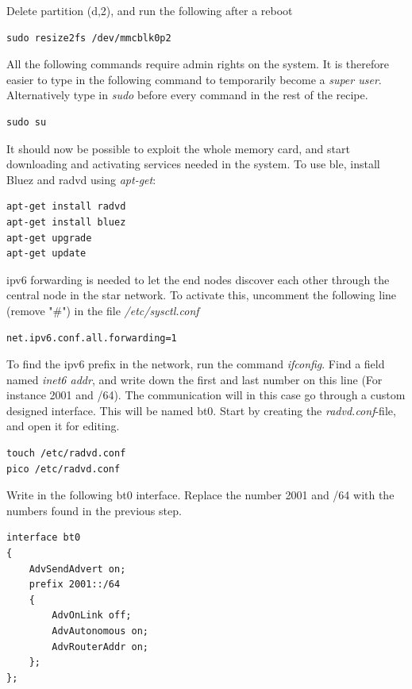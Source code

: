 Delete partition (d,2), and run the following after a reboot

\begin{verbatim}
sudo resize2fs /dev/mmcblk0p2
\end{verbatim}

\noindent All the following commands require admin rights on the system. It is therefore easier to type in the following command to temporarily become a \textit{super user}. Alternatively type in \textit{sudo} before every command in the rest of the recipe.

\begin{verbatim}
sudo su
\end{verbatim} 

\noindent It should now be possible to exploit the whole memory card, and start downloading and activating services needed in the system. To use \gls{ble}, install Bluez and radvd using \textit{apt-get}:

\begin{verbatim}
apt-get install radvd
apt-get install bluez
apt-get upgrade
apt-get update
\end{verbatim}

\noindent \gls{ipv6} forwarding is needed to let the end nodes discover each other through the central node in the star network. To activate this, uncomment the following line (remove "\#") in the file \textit{/etc/sysctl.conf}

\begin{verbatim}
net.ipv6.conf.all.forwarding=1
\end{verbatim}

\noindent To find the \gls{ipv6} prefix in the network, run the command \textit{ifconfig}. Find a field named \textit{inet6 addr}, and write down the first and last number on this line (For instance 2001 and /64). 
The communication will in this case go through a custom designed interface. This will be named bt0. Start by creating the \textit{radvd.conf}-file, and open it for editing. 

\begin{verbatim}
touch /etc/radvd.conf
pico /etc/radvd.conf
\end{verbatim} 


\noindent Write in the following bt0 interface. Replace the number 2001 and /64 with the numbers found in the previous step. 

\begin{verbatim}
interface bt0
{
    AdvSendAdvert on;
    prefix 2001::/64
    {
        AdvOnLink off;
        AdvAutonomous on;
        AdvRouterAddr on;
    };
};
\end{verbatim} 

